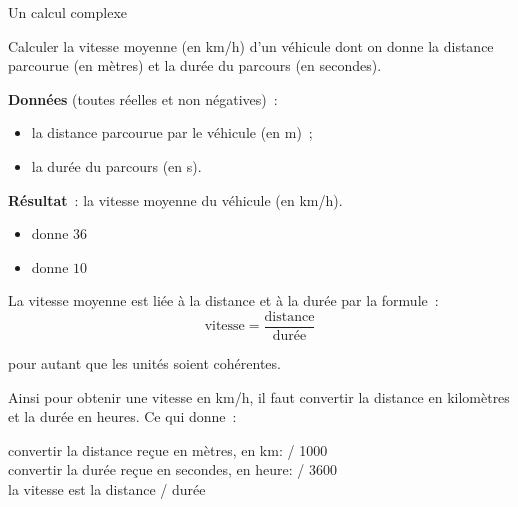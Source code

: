 \begin{Fiche}{Un calcul complexe}
\label{fiche:calcul-complexe}


	Calculer la vitesse moyenne (en km/h) d’un véhicule dont on donne la
	distance parcourue (en mètres) et la durée du parcours (en secondes). 

	
	\textbf{Données} (toutes réelles et non négatives)~:
		\begin{itemize}
		\item la distance parcourue par le véhicule (en m)~;
		\item la durée du parcours (en s).
		\end{itemize}
		
	\textbf{Résultat}~: la vitesse moyenne du véhicule (en km/h).

	\begin{center}
	\end{center}


	\begin{itemize}
	\item {} donne $36$
	\item {} donne $10$
	\end{itemize}


	La vitesse moyenne est liée à la distance et à la durée par la formule~:
	\[
		\textrm{vitesse} = \frac{\textrm{distance}}{\textrm{durée}}
	\]

	\begin{flushright}
	pour autant que les unités soient cohérentes.
	\end{flushright}

	Ainsi pour obtenir une vitesse en km/h, il faut convertir la distance en
	kilomètres et la durée en heures.  Ce qui donne~:

	\begin{langagenaturel}
		convertir la distance reçue en mètres, en km: / 1000\\
		convertir la durée reçue en secondes, en heure: / 3600\\
		la vitesse est la distance / durée
	\end{langagenaturel}
		

\end{Fiche}
